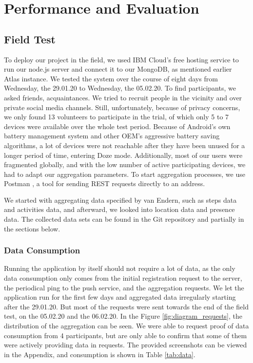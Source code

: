 
\chapter{Performance and Evaluation}\label{chapter:evaluation}
\section{Field Test}\label{sec:field_test}
To deploy our project in the field, we used IBM Cloud's free hosting service to run our node.js server and connect it to our MongoDB, as mentioned earlier Atlas instance. We tested the system over the course of eight days from Wednesday, the 29.01.20 to Wednesday, the 05.02.20. To find participants, we asked friends, acquaintances. We tried to recruit people in the vicinity and over private social media channels. Still, unfortunately, because of privacy concerns, we only found 13 volunteers to participate in the trial, of which only 5 to 7 devices were available over the whole test period. Because of Android's own battery management system and other OEM's aggressive battery saving algorithms, a lot of devices were not reachable after they have been unused for a longer period of time, entering Doze mode. Additionally, most of our users were fragmented globally, and with the low number of active participating devices, we had to adapt our aggregation parameters. To start aggregation processes, we use Postman \cite{postman}, a tool for sending REST requests directly to an address.

We started with aggregating data specified by van Endern, such as steps data and activities data, and afterward, we looked into location data and presence data. The collected data sets can be found in the Git repository
and partially in the sections below.

\subsection{Data Consumption}
Running the application by itself should not require a lot of data, as the only data consumption only comes from the initial registration request to the server, the periodical ping to the push service, and the aggregation requests. We let the application run for the first few days and aggregated data irregularly starting after the 29.01.20. But most of the requests were sent towards the end of the field test, on the 05.02.20 and the 06.02.20. In the Figure \ref{fig:diagram_requests}, the distribution of the aggregation can be seen. We were able to request proof of data consumption from 4 participants, but are only able to confirm that some of them were actively providing data in requests. The provided screenshots can be viewed in the Appendix, and consumption is shown in Table \ref{tab:data}. 

